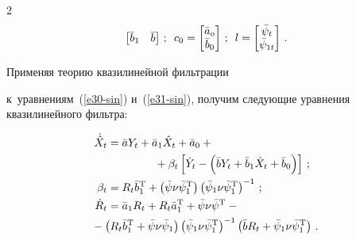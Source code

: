 \begin{multicols}{2}
\begin{equation*}
\begin{bmatrix}
    \bar b_1&\bar b\end{bmatrix}\,; \enskip

    c_0=\begin{bmatrix}

    \bar a_o\\

    \bar b_0\end{bmatrix}\,;\enskip

    l=\begin{bmatrix}

    \bar \psi_t\\

    \bar\psi_{1t}\end{bmatrix}\,.\label{e35-sin}

\end{equation*}



Применяя теорию квазилинейной фильтрации~\cite{1-sin}

к~уравнениям~(\ref{e30-sin}) и~(\ref{e31-sin}), получим следующие уравнения квазилинейного фильтра:

\begin{align}

    \dot{\hat X}_t& = \bar a Y_t +\bar a_1 \hat X_t + \bar a_0 +{}\notag\\

     &\hspace*{15mm}{}+\beta_t \left[ \dot Y_t - \left( \bar b Y_t +\bar b_1 \hat{X}_t + \bar b_0\right) \right]\,;

    \label{e36-sin}

\\

   \beta_t &= R_t \bar b_1^{\mathrm{T}} +\left(\bar\psi\nu\bar\psi_1^{\mathrm{T}}\right) \left(\bar \psi_1 \nu \bar \psi_1^{\mathrm{T}}\right)^{-1}\,;\label{e37-sin}\\

    \dot R_t &= \bar a_1 R_t + R_t \bar a_1^{\mathrm{T}} +\bar\psi\nu\bar\psi^{\mathrm{T}} -{}\notag\\

&\hspace*{-5mm}{}-\left(R_t \bar b_1^{\mathrm{T}} +\bar\psi\nu\bar\psi_1\right)\left(\bar\psi_1 \nu\bar\psi_1^{\mathrm{T}}\right)^{-1} \left( \bar b R_t +\bar\psi_1\nu\bar\psi_1^{\mathrm{T}}\right)\,.

    \label{e38-sin}

    \end{align}




\end{multicols}
